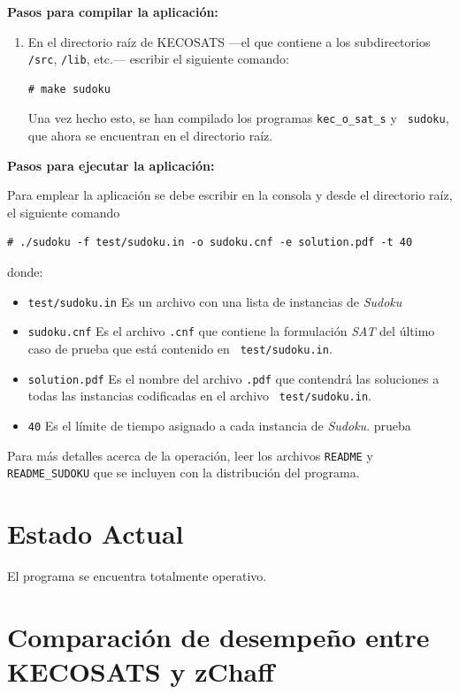 \documentclass[12pt,lettersize,oneside]{article}
\begin{document}
\textbf{Pasos para compilar la aplicación:}
\begin{enumerate}
\item En el directorio raíz de KECOSATS ---el que contiene a los subdirectorios
  {\tt /src}, {\tt /lib}, etc.--- escribir el siguiente comando:
\begin{lstlisting}[style=consola]
# make sudoku
\end{lstlisting}

Una vez hecho esto, se han compilado los programas {\tt kec\_o\_sat\_s} y {\tt
  sudoku}, que ahora se encuentran en el directorio raíz.

\end{enumerate}

\textbf{Pasos para ejecutar la aplicación:}

Para emplear la aplicación se debe escribir en la consola y desde el directorio
raíz, el siguiente comando
\begin{lstlisting}[style=consola2]
# ./sudoku -f test/sudoku.in -o sudoku.cnf -e solution.pdf -t 40
\end{lstlisting}
donde:\vspace{-2.5mm}
\begin{itemize}
\item {\tt test/sudoku.in} Es un archivo con una lista de instancias de
  \emph{Sudoku}
\item {\tt sudoku.cnf} Es el archivo {\tt .cnf} que contiene la formulación
  \emph{SAT} del último caso de prueba que está contenido en {\tt
    test/sudoku.in}.
\item {\tt solution.pdf} Es el nombre del archivo {\tt .pdf} que contendrá las
  soluciones a todas las instancias codificadas en el archivo {\tt
    test/sudoku.in}.
\item{\tt 40} Es el límite de tiempo asignado a cada instancia de \emph{Sudoku}.
  prueba 
\end{itemize}

Para más detalles acerca de la operación, leer los archivos {\tt README} y {\tt
  README\_SUDOKU} que se incluyen con la distribución del programa.
\section{Estado Actual}
El programa se encuentra totalmente operativo.

\section{Comparación de desempeño entre KECOSATS y zChaff}
\end{document}
